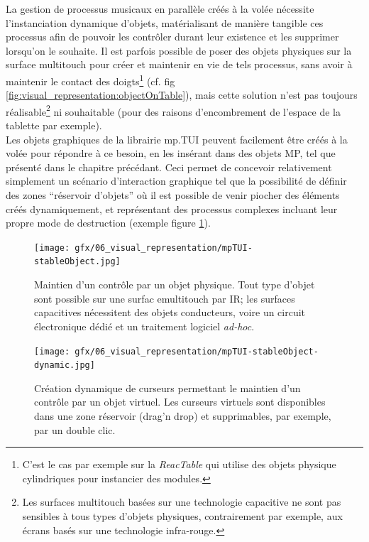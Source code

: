 \noindent La gestion de processus musicaux en parallèle créés à la volée nécessite l'instanciation dynamique d'objets, matérialisant de manière tangible ces processus afin de pouvoir les contrôler durant leur existence et les supprimer lorsqu'on le souhaite. Il est parfois possible de poser des objets physiques sur la surface multitouch pour créer et maintenir en vie de tels processus, sans avoir à maintenir le contact des doigts\footnote{C'est le cas par exemple sur la \textit{ReacTable} qui utilise des objets physique cylindriques pour instancier des modules.} (cf. fig \ref{fig:visual_representation:objectOnTable}), mais cette solution n'est pas toujours réalisable\footnote{Les surfaces multitouch basées sur une technologie capacitive ne sont pas sensibles à tous types d'objets physiques, contrairement par exemple, aux écrans basés sur une technologie infra-rouge.} ni souhaitable (pour des raisons d'encombrement de l'espace de la tablette par exemple).\\
\indent Les objets graphiques de la librairie mp.TUI peuvent facilement être créés à la volée pour répondre à ce besoin, en les insérant dans des objets MP, tel que présenté dans le chapitre précédant. Ceci permet de concevoir relativement simplement un scénario d'interaction graphique tel que la possibilité de définir des zones ``réservoir d'objets'' où il est possible de venir piocher des éléments créés dynamiquement, et représentant des processus complexes incluant leur propre mode de destruction (exemple figure \ref{fig:visual_representation:dynamicInstanciation}).
\begin{figure}[!htbp]
	\captionsetup{format=plain}%
	\centering
	\begin{minipage}[t]{0.48\textwidth}
		\texttt{[image: gfx/06\_visual\_representation/mpTUI-stableObject.jpg]}
		\caption[Maintien d'un contrôle par un objet physique]{Maintien d'un contrôle par un objet physique. Tout type d'objet sont possible sur une surfac emultitouch par IR; les surfaces capacitives nécessitent des objets conducteurs, voire un circuit électronique dédié et un traitement logiciel \textit{ad-hoc}.}
		\label{fig:visual_representation:objectOnTable}
	\end{minipage}
	\hspace{.02\linewidth}
	\begin{minipage}[t]{0.48\textwidth}
	    \texttt{[image: gfx/06\_visual\_representation/mpTUI-stableObject-dynamic.jpg]}
		\caption[Maintien d'un contrôle par un objet virtuel]{Création dynamique de curseurs permettant le maintien d'un contrôle par un objet virtuel. Les curseurs virtuels sont disponibles dans une zone réservoir (drag'n drop) et supprimables, par exemple, par un double clic.}
		\label{fig:visual_representation:dynamicInstanciation}
	\end{minipage}
\end{figure}

